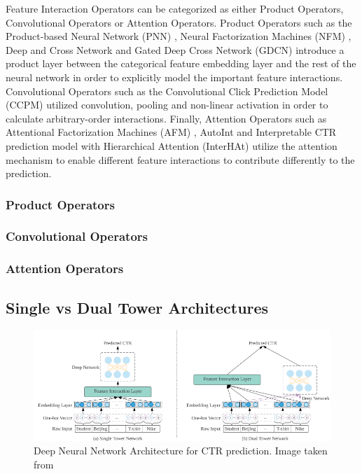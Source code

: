\documentclass{mldsmsc}
\begin{document}
Feature Interaction Operators can be categorized as either Product Operators, Convolutional Operators or 
Attention Operators. Product Operators such as the Product-based Neural Network (PNN) \citep{RefWorks:qu2016product-based}, 
Neural Factorization Machines (NFM) \citep{RefWorks:he2017neural}, Deep and Cross Network \citep{RefWorks:wang2017deep} and 
Gated Deep Cross Network (GDCN) \citep{RefWorks:wang2023deeper} introduce a product layer between the categorical 
feature embedding layer and the rest of the neural network in order to explicitly model the important feature 
interactions. Convolutional Operators such as the Convolutional Click Prediction Model (CCPM) \citep{RefWorks:liu2015convolutional} 
utilized convolution, pooling and non-linear activation in order to calculate arbitrary-order interactions. 
Finally, Attention Operators such as Attentional Factorization Machines (AFM) \citep{RefWorks:xiao2017attentional}, AutoInt 
\cite{RefWorks:song2019autoint} and Interpretable CTR prediction model with Hierarchical Attention (InterHAt) \citep{RefWorks:li2020interpretable}
utilize the attention mechanism to enable different feature interactions to contribute differently to the 
prediction.

\subsubsection{Product Operators}

\subsubsection{Convolutional Operators}

\subsubsection{Attention Operators}

\subsection{Single vs Dual Tower Architectures}


\begin{figure}[h]
\centering
\includegraphics[width=\textwidth]{../figures/single_dual_dnn.png}
\caption{Deep Neural Network Architecture for CTR prediction. Image taken from \cite{RefWorks:zhang2021deep}}
\label{fig:dnn_architecture}
\end{figure}
\end{document}
